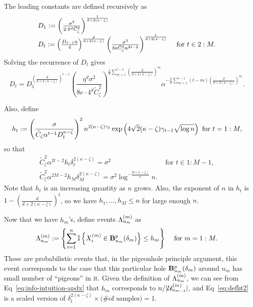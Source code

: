 The leading constants are defined recursively as
\begin{equation}
\label{eq:defDt}
\begin{array}{ll}
D_1 := \left ( \frac{\sigma^2}{2 \cdot 8^{d} \tilde C_\zeta^2 } \right )^{\frac{1}{d+2(\kappa-\zeta)}}\\
D_t := \left ( \frac{D_{t-1} \eta}{4} \right )^{\frac{d}{d+2(\kappa-\zeta)}} 
\left ( \frac{\sigma^2} {8e \tilde C_\zeta^2 \alpha^{2t-2}} \right)^{\frac{1}{d+2(\kappa-\zeta)}}
&\text{ for } t \in 2:M.
\end{array}
\end{equation}
Solving the recurrence of $D_t$ gives
\begin{equation}
\label{eq:defDt2}
D_t = D_1^{\left( \frac{d}{d+2(\kappa-\zeta)} \right)^{t-1} }
\left ( \frac{\eta^d \sigma^2}{8e\cdot 4^d \tilde C_\zeta^2} \right)
^{\frac{1}{d}\sum_{m=1}^{t-1} \left (\tfrac{d}{d+2(\kappa-\zeta)}\right )^m}
\alpha^{-\frac{2}{d} \sum_{m=1}^{t-1} (t-m) \left (\tfrac{d}{d+2(\kappa-\zeta)}\right )^m }.
\end{equation}

Also, define 
\begin{equation}
\label{eq:defht}
h_t := \left ( \frac{\sigma}{\tilde C_\zeta \alpha^{t-1} D_t^{\kappa-\zeta}} \right )^2 
n^{2(\kappa-\zeta) \gamma_t} 
\exp \left( 4 \sqrt{2} (\kappa-\zeta) \gamma_{t-1} \sqrt{\log n} \right)
\text{ for } t= 1:M,
\end{equation}
so that
\begin{equation}
\label{eq:defht2}
\begin{array}{ll}
\tilde C_\zeta^2 \alpha^{2t-2} h_t \delta_t^{2(\kappa-\zeta)} = \sigma^2
&\text{ for } t \in 1:M-1,
\\
\tilde C_\zeta^2 \alpha^{2M-2} h_M \delta_M^{2(\kappa-\zeta)} = \sigma^2 \log^{-\frac{2\nu(\kappa-\zeta)}{\kappa}}n.
\end{array}
\end{equation}
Note that $h_t$ is an increasing quantity as $n$ grows. Also, the exponent of $n$ in $h_t$ is 
$1-(\frac{d}{d+2(\kappa-\zeta)})^t$, so we have $h_1, \dots, h_M \leq n$ for large enough $n$.

Now that we have $h_m$'s, define events $\Lambda_{u_{m}}^{({m})}$ as
\begin{align*}
	\Lambda_{u_{m}}^{({m})} &:= \left\{ \sum_{i=1}^n \mathbb{I}\left\{{ X_{i}^{(m)}\in \mathbf{B}^p_{u_{m}}({\delta_{m}}) }\right\} \leq h_m \right\} & \textup{ for } m = 1:M.
\end{align*}
These are probabilistic events that, 
in the pigeonhole principle argument, this event corresponds to the case that this particular hole $\mathbf{B}^p_{u_{m}}({\delta_{m}})$ around $u_m$ has small number of ``pigeons'' in it.
Given the definition of $\Lambda_{u_{m}}^{({m})}$, we can see from Eq~\eqref{eq:info-intuition-apdx} that $h_m$ corresponds to $n/|\mathcal{U}^{({m})}_{u_{m-1}}|$, and Eq~\eqref{eq:defht2} is a scaled version of $\delta_t^{2(\kappa-\zeta)} \times \text{(\# of samples)}=1$.

